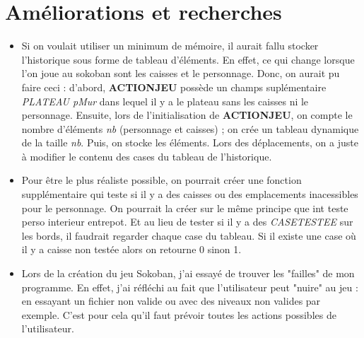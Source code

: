 \documentclass[a4]{article}
\begin{document}
\section{Améliorations et recherches}
\begin{itemize}
\item Si on voulait utiliser un minimum de mémoire, il aurait fallu stocker l'historique sous forme de tableau d'éléments. 
En effet, ce qui change lorsque l'on joue au sokoban sont les caisses et le personnage. Donc, on aurait pu faire ceci : 
d'abord, \textbf{ACTIONJEU} possède un champs suplémentaire \textit{PLATEAU pMur} dans lequel il y a le plateau sans les caisses ni le personnage.
Ensuite, lors de l'initialisation de \textbf{ACTIONJEU}, on compte le nombre d'éléments \textit{nb} (personnage et caisses) ; on crée un tableau dynamique de la taille \textit{nb}.
Puis, on stocke les éléments. Lors des déplacements, on a juste à modifier le contenu des cases du tableau de l'historique.\newline

\item Pour être le plus réaliste possible, on pourrait créer une fonction supplémentaire qui teste si il y a des caisses ou des emplacements inacessibles pour le personnage. 
On pourrait la créer sur le même principe que int teste perso interieur entrepot. 
Et au lieu de tester si il y a des \emph{CASE\textunderscore TESTEE} sur les bords, il faudrait regarder chaque case du tableau. Si il existe une case où il y a caisse non testée alors on retourne 0 sinon 1.\newline

\item Lors de la création du jeu Sokoban, j'ai essayé de trouver les "failles" de mon programme. En effet, j'ai réfléchi au fait que l'utilisateur peut "nuire" au jeu : en essayant un fichier non valide ou avec des niveaux non valides par exemple. 
C'est pour cela qu'il faut prévoir toutes les actions possibles de l'utilisateur. \newline

\end{itemize}
\end{document}
